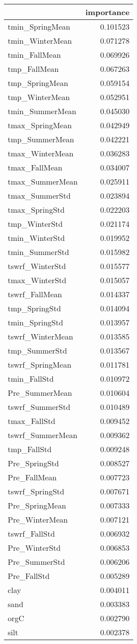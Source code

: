 \begin{tabular}{lr}
\toprule
 & importance \\
\midrule
tmin_SpringMean & 0.101523 \\
tmin_WinterMean & 0.071278 \\
tmin_FallMean & 0.069926 \\
tmp_FallMean & 0.067263 \\
tmp_SpringMean & 0.059154 \\
tmp_WinterMean & 0.052951 \\
tmin_SummerMean & 0.045030 \\
tmax_SpringMean & 0.042949 \\
tmp_SummerMean & 0.042221 \\
tmax_WinterMean & 0.036283 \\
tmax_FallMean & 0.034007 \\
tmax_SummerMean & 0.025911 \\
tmax_SummerStd & 0.023894 \\
tmax_SpringStd & 0.022203 \\
tmp_WinterStd & 0.021174 \\
tmin_WinterStd & 0.019952 \\
tmin_SummerStd & 0.015982 \\
tswrf_WinterStd & 0.015577 \\
tmax_WinterStd & 0.015057 \\
tswrf_FallMean & 0.014337 \\
tmp_SpringStd & 0.014094 \\
tmin_SpringStd & 0.013957 \\
tswrf_WinterMean & 0.013585 \\
tmp_SummerStd & 0.013567 \\
tswrf_SpringMean & 0.011781 \\
tmin_FallStd & 0.010972 \\
Pre_SummerMean & 0.010604 \\
tswrf_SummerStd & 0.010489 \\
tmax_FallStd & 0.009452 \\
tswrf_SummerMean & 0.009362 \\
tmp_FallStd & 0.009248 \\
Pre_SpringStd & 0.008527 \\
Pre_FallMean & 0.007723 \\
tswrf_SpringStd & 0.007671 \\
Pre_SpringMean & 0.007333 \\
Pre_WinterMean & 0.007121 \\
tswrf_FallStd & 0.006932 \\
Pre_WinterStd & 0.006853 \\
Pre_SummerStd & 0.006206 \\
Pre_FallStd & 0.005289 \\
clay & 0.004011 \\
sand & 0.003383 \\
orgC & 0.002790 \\
silt & 0.002378 \\
\bottomrule
\end{tabular}
